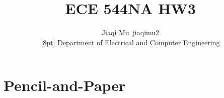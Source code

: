 \documentclass[12pt]{article}
\newcommand{\1}{\mathbf{1}}
\begin{document}
{\raggedright


\title{ECE 544NA HW3}%
\author{Jiaqi Mu~jiaqimu2 \\
[8pt]%
Department of Electrical and Computer Engineering} %

\maketitle

\section{Pencil-and-Paper\label{sec:1}}

}
\end{document}
